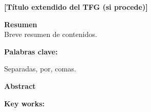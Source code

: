 
\newpage

\thispagestyle{empty}

{\bf \large [Título extendido del TFG (si procede)]}

\vspace{0.5cm}

{\bf \large Resumen}\\
Breve resumen de contenidos.


\vspace{5cm}


{\bf Palabras clave:}


   
   Separadas, por, comas.
   
   \vspace{1 cm}


{\bf \large Abstract}\\

\vspace{5cm}

{\bf Key works:}

